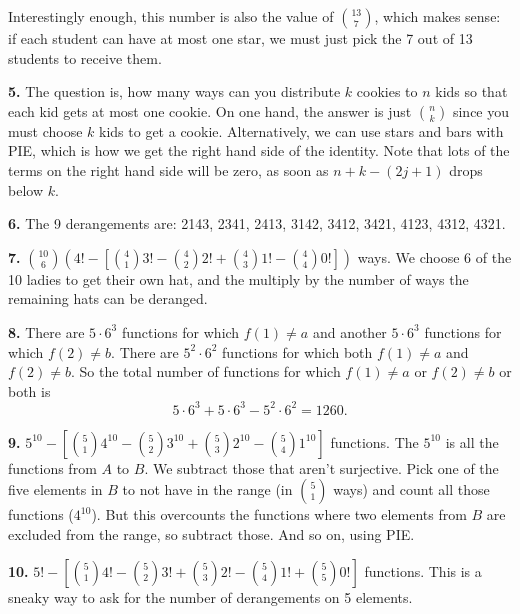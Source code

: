 \documentclass[10pt,]{book}
\theoremstyle{plain}
\theoremstyle{definition}
\theoremstyle{definition}
\theoremstyle{definition}
\numberwithin{equation}{chapter}
\begin{document}
            Interestingly enough, this number is also the value of \({13 \choose 7}\), which makes sense: if each student can have at most one star, we must just pick the 7 out of 13 students to receive them.
\par\smallskip
\noindent\textbf{5.}\quad{}
            The question is, how many ways can you distribute \(k\) cookies to \(n\) kids so that each kid gets at most one cookie. On one hand, the answer is just \({n \choose k}\) since you must choose \(k\) kids to get a cookie. Alternatively, we can use stars and bars with PIE, which is how we get the right hand side of the identity. Note that lots of the terms on the right hand side will be zero, as soon as \(n+k-(2j+1)\) drops below \(k\).
\par\smallskip
\noindent\textbf{6.}\quad{}
            The 9 derangements are: 2143, 2341, 2413, 3142, 3412, 3421, 4123, 4312, 4321.
\par\smallskip
\noindent\textbf{7.}\quad{}
            \({10 \choose 6}\left(4! - \left[{4 \choose 1} 3! - {4 \choose 2}2! + {4 \choose 3}1! - {4 \choose 4}0!\right]\right)\) ways. We choose 6 of the 10 ladies to get their own hat, and the multiply by the number of ways the remaining hats can be deranged.
\par\smallskip
\noindent\textbf{8.}\quad{}
      There are \(5 \cdot 6^3\) functions for which \(f(1) \ne a\) and another \(5 \cdot 6^3\) functions for which \(f(2) \ne b\).  There are \(5^2 \cdot 6^2\) functions for which both \(f(1) \ne a\) and \(f(2) \ne b\).  So the total number of functions for which \(f(1) \ne a\) or \(f(2) \ne b\) or both is
      \begin{equation*}
        5 \cdot 6^3 + 5 \cdot 6^3 - 5^2 \cdot 6^2 = 1260.
      \end{equation*}
\par\smallskip
\noindent\textbf{9.}\quad{}
      \(5^{10} - \left[{5 \choose 1}4^{10} - {5 \choose 2}3^{10} + {5 \choose 3}2^{10} - {5 \choose 4}1^{10}\right]\) functions.  The \(5^{10}\) is all the functions from \(A\) to \(B\).  We subtract those that aren't surjective.  Pick one of the five elements in \(B\) to not have in the range (in \({5 \choose 1}\) ways) and count all those functions (\(4^{10}\)).  But this overcounts the functions where two elements from \(B\) are excluded from the range, so subtract those.  And so on, using PIE.
\par\smallskip
\noindent\textbf{10.}\quad{}
      \(5! - \left[{5 \choose 1}4! - {5 \choose 2}3! + {5 \choose 3}2! - {5 \choose 4}1! + {5 \choose 5}0!\right]\) functions. This is a sneaky way to ask for the number of derangements on 5 elements.
\par\smallskip
\end{document}
